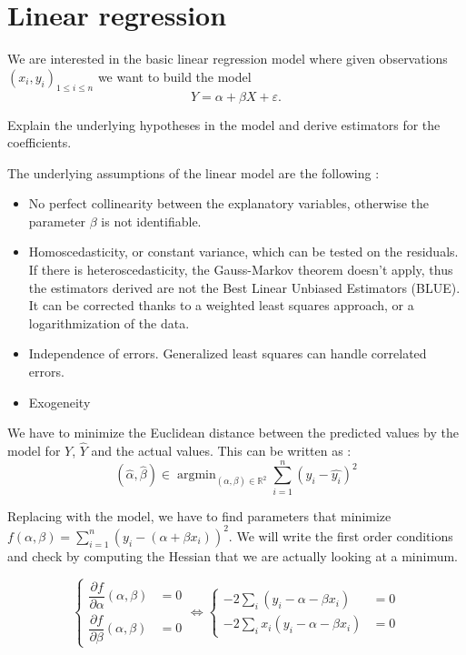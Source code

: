 \section{Linear regression}

\begin{tcolorbox}[width=\linewidth, sharp corners=all, colback=white!95!black]
We are interested in the basic linear regression model where given observations $(x_i, y_i)_{1\leq i \leq n}$ we want to build the model $$Y = \alpha + \beta X + \varepsilon.$$

Explain the underlying hypotheses in the model and derive estimators for the coefficients.

\end{tcolorbox}

The underlying assumptions of the linear model are the following :

\begin{itemize}
    \item No perfect collinearity between the explanatory variables, otherwise the parameter $\beta$ is not identifiable.
    \item Homoscedasticity, or constant variance, which can be tested on the residuals. If there is heteroscedasticity, the Gauss-Markov theorem doesn't apply, thus the estimators derived are not the Best Linear Unbiased Estimators (BLUE). It can be corrected thanks to a weighted least squares approach, or a logarithmization of the data.
    \item Independence of errors. Generalized least squares can handle correlated errors.
    \item Exogeneity 
\end{itemize}

We have to minimize the Euclidean distance between the predicted values by the model for $Y$, $\hat{Y}$ and the actual values. This can be written as :
$$(\hat{\alpha}, \hat{\beta}) \in \operatorname{argmin}_{(\alpha, \beta) \in \mathbb{R}^2} \displaystyle \sum_{i=1}^{n} (y_i - \hat{y_i})^2$$

Replacing with the model, we have to find parameters that minimize $f(\alpha, \beta) = \displaystyle \sum_{i=1}^{n} (y_i - (\alpha + \beta x_i))^2.$ We will write the first order conditions and check by computing the Hessian that we are actually looking at a minimum.

$$\left\{\begin{array}{ll}
        \dfrac{\partial f}{\partial \alpha}(\alpha, \beta) &= 0 \\
        \dfrac{\partial f}{\partial \beta}(\alpha, \beta) &= 0
    \end{array}\right. \Leftrightarrow 
\left\{\begin{array}{ll}
        -2\sum_i (y_i - \alpha - \beta x_i) &= 0 \\
        -2\sum_i x_i (y_i - \alpha - \beta x_i) &= 0
    \end{array}\right.$$

